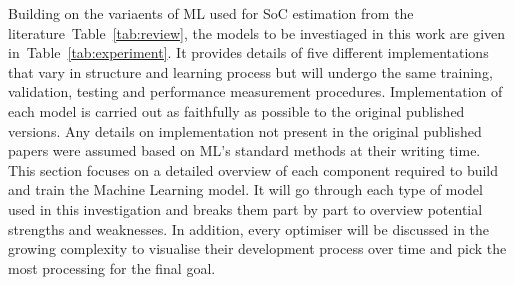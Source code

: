 %
Building on the variaents of ML used for SoC estimation from the literature~\mbox{Table~\ref{tab:review}}, the models to be investiaged in this work are given in~\mbox{Table~\ref{tab:experiment}}.
It provides details of five different implementations that vary in structure and learning process but will undergo the same training, validation, testing and performance measurement procedures.
Implementation of each model is carried out as faithfully as possible to the original published versions.
Any details on implementation not present in the original published papers were assumed based on ML's standard methods at their writing time.
This section focuses on a detailed overview of each component required to build and train the Machine Learning model.
It will go through each type of model used in this investigation and breaks them part by part to overview potential strengths and weaknesses.
In addition, every optimiser will be discussed in the growing complexity to visualise their development process over time and pick the most processing for the final goal.

